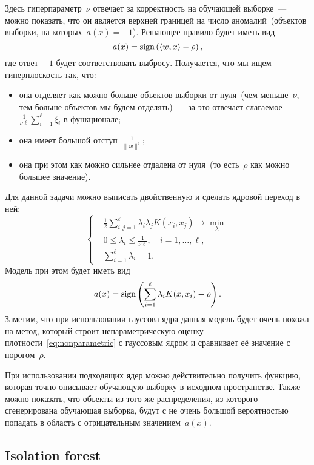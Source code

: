 \documentclass[12pt,fleqn]{article}
\begin{document}
Здесь гиперпараметр~$\nu$ отвечает за корректность на обучающей выборке~---
можно показать, что он является верхней границей на число аномалий~(объектов выборки,
на которых~$a(x) = -1$).
Решающее правило будет иметь вид
\[
    a(x)
    =
    \mathop{\rm sign}\limits\left(
        \langle w, x \rangle
        -
        \rho
    \right),
\]
где ответ~$-1$ будет соответствовать выбросу.
Получается, что мы ищем гиперплоскость так, что:
\begin{itemize}
    \item она отделяет как можно больше объектов выборки от нуля~(чем меньше~$\nu$, тем больше объектов мы будем отделять)~---
        за это отвечает слагаемое~$\frac{1}{\nu \ell} \sum_{i = 1}^{\ell} \xi_i$ в функционале;
    \item она имеет большой отступ~$\frac{1}{\|w\|^2}$;
    \item она при этом как можно сильнее отдалена от нуля~(то есть~$\rho$ как можно большее значение).
\end{itemize}

Для данной задачи можно выписать двойственную и сделать ядровой переход в ней:
\[
    \left\{
        \begin{aligned}
            & \frac{1}{2} \sum_{i, j = 1}^{\ell}
                \lambda_i \lambda_j K(x_i, x_j)
            \to \min_{\lambda} \\
            & 0 \leq \lambda_i \leq \frac{1}{\nu \ell},
            \quad i = 1, \dots, \ell, \\
            & \sum_{i = 1}^{\ell} \lambda_i = 1.
        \end{aligned}
    \right.
\]
Модель при этом будет иметь вид
\[
    a(x)
    =
    \mathop{\rm sign}\limits\left(
        \sum_{i = 1}^{\ell}
            \lambda_i K(x, x_i)
        -
        \rho
    \right).
\]
Заметим, что при использовании гауссова ядра данная модель будет очень похожа
на метод, который строит непараметрическую оценку плотности~\eqref{eq:nonparametric} с гауссовым ядром
и сравнивает её значение с порогом~$\rho$.

При использовании подходящих ядер можно действительно получить функцию, которая
точно описывает обучающую выборку в исходном пространстве.
Также можно показать, что объекты из того же распределения, из которого сгенерирована
обучающая выборка, будут с не очень большой вероятностью попадать в область
с отрицательным значением~$a(x)$.


\subsection{Isolation forest}
\end{document}
